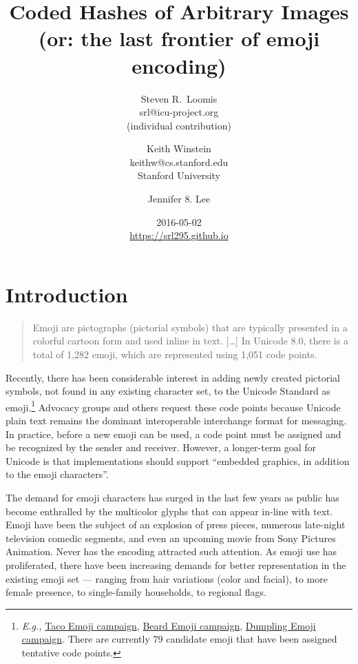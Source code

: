 \documentclass[12pt]{article}
\title{Coded Hashes of Arbitrary Images\\\normalsize \sf (or: the last frontier of emoji encoding)}
\author{
Steven R.~Loomis\\
\small srl@icu-project.org\\
\small (individual contribution)\\
\and
Keith Winstein\\
\small keithw@cs.stanford.edu\\
\small Stanford University\\
\and
Jennifer 8. Lee\\
}
\date{2016-05-02\\\small\url{https://srl295.github.io}}                                           %
\begin{document}
\maketitle

\section{Introduction}

\begin{quote}
Emoji are pictographs (pictorial symbols) that are typically presented
in a colorful cartoon form and used inline in text. [\ldots] In
Unicode 8.0, there is a total of 1,282 emoji, which are represented
using 1,051 code points.\autocite{UTR51}
\end{quote}

Recently, there has been considerable interest in adding newly created
pictorial symbols, not found in any existing character set, to the
Unicode Standard as emoji.\footnote{\textit{E.g.,}
  \href{https://www.change.org/p/unicode-consortium-the-taco-emoji-needs-to-happen-aeb4ebc7-a323-441d-90b9-20b90c83a8c6}{Taco
    Emoji campaign}, \href{http://www.beardemoji.com/}{Beard Emoji
    campaign}, \href{http://www.dumplingemoji.org}{Dumpling Emoji
    campaign}. There are currently 79 candidate emoji that have been
  assigned tentative code points.} Advocacy groups and others request
these code points because Unicode plain text remains the dominant
interoperable interchange format for messaging. In practice, before a
new emoji can be used, a code point must be assigned and be recognized
by the sender and receiver. However, a longer-term goal for Unicode is
that implementations should support ``embedded graphics, in addition
to the emoji characters''\autocite[Section 8, ``Longer Term
  Solutions'']{UTR51}.

The demand for emoji characters has surged in the last few years as public has become enthralled by the multicolor glyphs that can appear in-line with text. Emoji have been the subject of an explosion of press pieces, numerous late-night television comedic segments, and even an upcoming movie from Sony Pictures Animation. Never has the encoding attracted such attention.
As emoji use has proliferated, there have been increasing demands for better representation in the existing emoji set — ranging from hair variations (color and facial), to more female presence, to single-family households, to regional flags.\autocite{UTR52}
\end{document}
